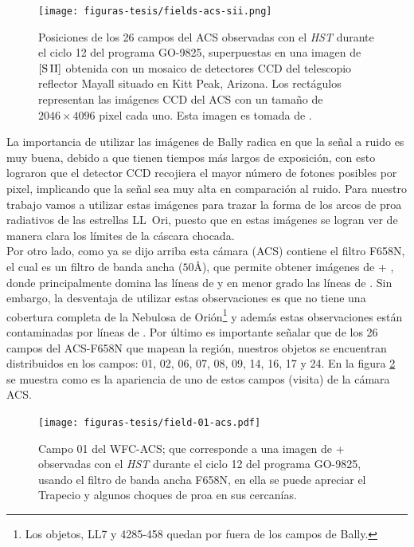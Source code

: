 \begin{figure}
  \centering
  \texttt{[image: figuras-tesis/fields-acs-sii.png]}
  \caption{Posiciones de los 26 campos del ACS observadas con el \textit{HST} durante el ciclo 12 del programa GO-9825, superpuestas en una imagen de \(\mathrm{[S\,II]}\) obtenida con un mosaico de detectores CCD del telescopio reflector Mayall situado en Kitt Peak, Arizona. Los rectágulos representan las imágenes CCD del ACS con un tamaño de \(2046 \times 4096\) pixel cada uno. Esta imagen es tomada de \citet{Bally:2006a}.}
  \label{fig:fields}
\end{figure}

La importancia de utilizar las imágenes de Bally radica en que la señal a ruido es muy buena, debido a que tienen tiempos más largos de exposición, con esto  lograron que el detector CCD recojiera el mayor número de fotones posibles por pixel, implicando que la señal sea muy alta en comparación al ruido. Para nuestro trabajo vamos a utilizar estas imágenes para trazar la forma de los arcos de proa radiativos de las estrellas LL~Ori, puesto que en estas imágenes se logran ver de manera clara los límites de la cáscara chocada.\\

Por otro lado, como ya se dijo arriba esta cámara (ACS) contiene el filtro F658N, el cual es un filtro de banda ancha (\(50 \text{Å}\)), que permite obtener imágenes de \ha{} + \nii{}, donde principalmente domina las líneas de \ha{} y en menor grado las líneas de \nii{}. Sin embargo, la desventaja de utilizar estas observaciones es que no tiene una cobertura completa de la Nebulosa de Orión\footnote{Los objetos, LL7 y 4285-458 quedan por fuera de los campos de Bally.} y además estas observaciones están contaminadas por líneas de \nii{}. Por último es importante señalar que de los 26 campos del ACS-F658N que mapean la región, nuestros objetos se encuentran distribuidos en los campos: 01, 02, 06, 07, 08, 09, 14, 16, 17 y 24. En la figura \ref{fig:field-01} se muestra como es la apariencia de uno de estos campos (visita) de la cámara ACS.\\

\begin{figure}
  \centering
  \texttt{[image: figuras-tesis/field-01-acs.pdf]}
  \caption{Campo 01 del WFC-ACS; que corresponde a una imagen de \ha{}+\nii{} observadas con el \textit{HST} durante el ciclo 12 del programa GO-9825, usando el filtro de banda ancha F658N, en ella se puede apreciar el Trapecio y algunos choques de proa en sus cercanías.}
  \label{fig:field-01}
\end{figure}

